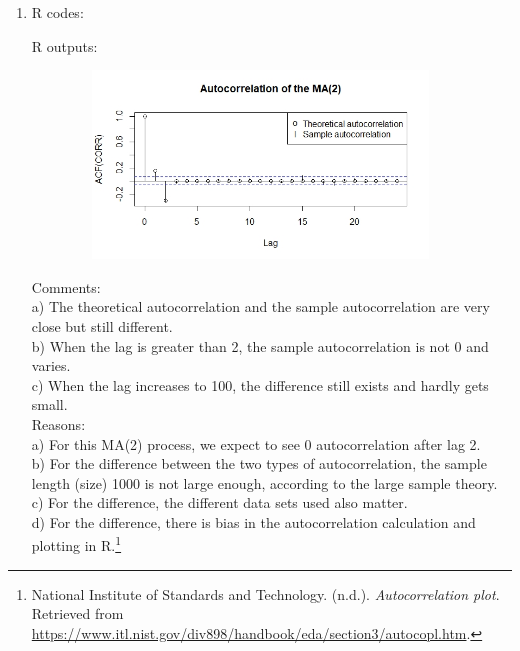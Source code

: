 \documentclass[10pt]{article}
\begin{document}
\begin{enumerate}[1)]
\item
R codes:

R outputs:
\begin{figure}[H]
  \centering
  \includegraphics[width=10cm,height=5cm]{p24a.jpeg}
\end{figure}
Comments:\\
a) The theoretical autocorrelation and the sample autocorrelation are very close but still different.\\
b) When the lag is greater than 2, the sample autocorrelation is not 0 and varies.\\
c) When the lag increases to 100, the difference still exists and hardly gets small.\\
Reasons:\\
a) For this MA(2) process, we expect to see 0 autocorrelation after lag 2.\\
b) For the difference between the two types of autocorrelation, the sample length (size) 1000 is not large enough, according to the large sample theory.\\
c) For the difference, the different data sets used also matter.\\
d) For the difference, there is bias in the autocorrelation calculation and plotting in R.\footnote{ National Institute of Standards and Technology. (n.d.). \textit{Autocorrelation plot}. Retrieved from \url{https://www.itl.nist.gov/div898/handbook/eda/section3/autocopl.htm}.}

\end{enumerate}
\vspace{3mm}
\end{document}
